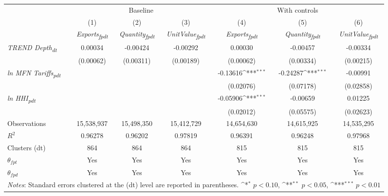{
\def\sym#1{\ifmmode^{#1}\else\(^{#1}\)\fi}
\begin{tabular}{l*{6}{c}}
\toprule
&\multicolumn{3}{c}{Baseline}&\multicolumn{3}{c}{With controls}\\\cmidrule(lr){2-4}\cmidrule(lr){5-7}
&(1)&(2)&(3)&(4)&(5)&(6)\\
&\textit{Exports\textsubscript{fpdt}}&\textit{Quantity\textsubscript{fpdt}}&\textit{UnitValue\textsubscript{fpdt}}&\textit{Exports\textsubscript{fpdt}}&\textit{Quantity\textsubscript{fpdt}}&\textit{UnitValue\textsubscript{fpdt}}\\
\midrule
\textit{TREND Depth\textsubscript{dt}} & 0.00034 & -0.00424 & -0.00292 & 0.00030 & -0.00457 & -0.00334\\
 & (0.00062) & (0.00311) & (0.00189) & (0.00062) & (0.00334) & (0.00215)\\
\addlinespace
\textit{ln MFN Tariffs\textsubscript{pdt}} &  &  &  & -0.13616\sym{***} & -0.24287\sym{***} & -0.00991\\
 &  &  &  & (0.02076) & (0.07178) & (0.02858)\\
\addlinespace
\textit{ln HHI\textsubscript{pdt}} &  &  &  & -0.05906\sym{***} & -0.00659 & 0.01225\\
 &  &  &  & (0.02012) & (0.05575) & (0.02623)\\
\midrule
Observations & 15,538,937 & 15,498,350 & 15,412,729 & 14,654,630 & 14,615,925 & 14,535,295\\
$R^{2}$ & 0.96278 & 0.96202 & 0.97819 & 0.96391 & 0.96248 & 0.97968\\
Clusters (dt) & 864 & 864 & 864 & 815 & 815 & 815\\
$\theta_{fpt}$ & Yes & Yes & Yes & Yes & Yes & Yes\\
$\theta_{fpd}$ & Yes & Yes & Yes & Yes & Yes & Yes\\
\bottomrule
\multicolumn{7}{l}{\footnotesize \textit{Notes}: Standard errors clustered at the (dt) level are reported in parentheses. \sym{*} \(p<0.10\), \sym{**} \(p<0.05\), \sym{***} \(p<0.01\)}\\
\end{tabular}
}
